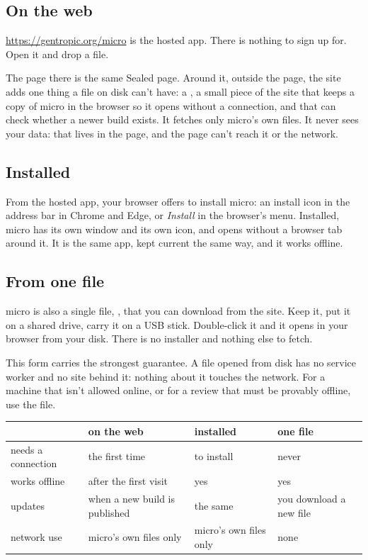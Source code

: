 \subsection{On the web}
\url{https://gentropic.org/micro} is the hosted app. There is nothing to sign up for. Open it and drop a file.

The page there is the same Sealed page. Around it, outside the page, the site adds one thing a file on disk can't have: a , a small piece of the site that keeps a copy of micro in the browser so it opens without a connection, and that can check whether a newer build exists. It fetches only micro's own files. It never sees your data: that lives in the page, and the page can't reach it or the network.

\subsection{Installed}\label{sec:sealed-install}
From the hosted app, your browser offers to install micro: an install icon in the address bar in Chrome and Edge, or \emph{Install} in the browser's menu. Installed, micro has its own window and its own icon, and opens without a browser tab around it. It is the same app, kept current the same way, and it works offline.

\subsection{From one file}\label{sec:sealed-file}
micro is also a single file, , that you can download from the site. Keep it, put it on a shared drive, carry it on a USB stick. Double-click it and it opens in your browser from your disk. There is no installer and nothing else to fetch.

This form carries the strongest guarantee. A file opened from disk has no service worker and no site behind it: nothing about it touches the network. For a machine that isn't allowed online, or for a review that must be provably offline, use the file.

\begin{tabularx}{\linewidth}{@{}lLLL@{}}\toprule
& on the web & installed & one file \\ \midrule
needs a connection & the first time & to install & never \\
works offline & after the first visit & yes & yes \\
updates & when a new build is published & the same & you download a new file \\
network use & micro's own files only & micro's own files only & none \\
\bottomrule
\end{tabularx}

